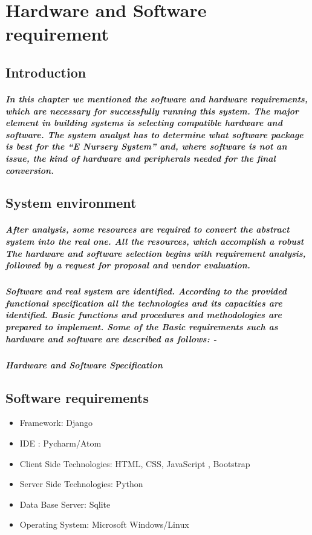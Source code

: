 \documentclass[12pt,a4paper]{report}
\begin{document}
		\chapter{Hardware and Software requirement}
		\section{Introduction}
		\paragraph
		{
			In this chapter we mentioned the software and hardware requirements, which are necessary for successfully running this system. The major element in building systems is selecting compatible hardware and software. The system analyst has to determine what software package is best for the “E Nursery System” and, where software is not an issue, the kind of hardware and peripherals needed for the final conversion.
		}
		\section{System environment}
		\paragraph
		{
			After analysis, some resources are required to convert the abstract system into the real one. All the resources, which accomplish a robust The hardware and software selection begins with requirement analysis, followed by a request for proposal and vendor evaluation.
		}
		\paragraph
		{
			Software and real system are identified. According to the provided functional specification all the technologies and its capacities are identified. Basic functions and procedures and methodologies are prepared to implement. Some of the Basic requirements such as hardware and software are described as follows: -
		}
		\paragraph{\textbf{Hardware and Software Specification}}
		\section{Software requirements}
		\begin{itemize}
			\item Framework: Django
			\item IDE : Pycharm/Atom
			\item Client Side Technologies: HTML, CSS, JavaScript , Bootstrap
			\item Server Side Technologies: Python
			\item Data Base Server: Sqlite
			\item Operating System: Microsoft Windows/Linux 
		\end{itemize}
\end{document}

